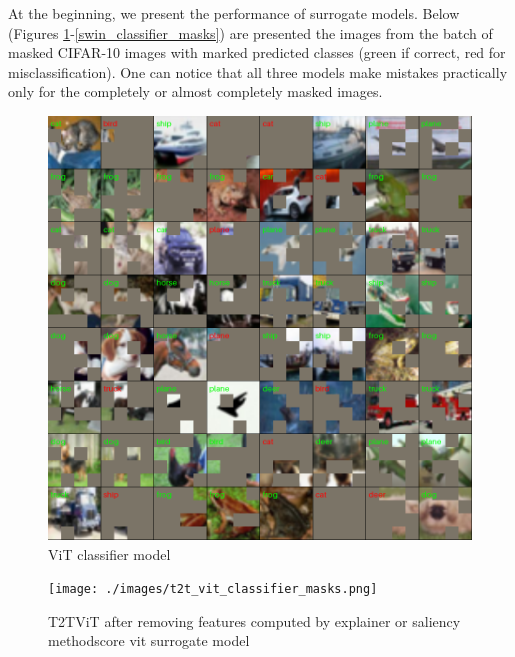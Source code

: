 \documentclass[en]{pracamgr}
\begin{document}
At the beginning, we present the performance of surrogate models. Below (Figures \ref{vit_classifier_masks}-\ref{swin_classifier_masks}) are presented the images from the batch of masked CIFAR-10 images with marked predicted classes (green if correct, red for misclassification). One can notice that all three models make mistakes practically only for the completely or almost completely masked images.

\begin{figure}[H]
\centering
\includegraphics[scale=0.5]{./images/vit_classifier_masks.png}
\caption{ViT classifier model}
\label{vit_classifier_masks}
\end{figure}


\begin{figure}[H]
\centering
\texttt{[image: ./images/t2t\_vit\_classifier\_masks.png]}
\caption{T2T\textunderscore ViT after removing features computed by explainer or saliency methodscore vit surrogate model}
\label{t2t_vit_classifier_masks}
\end{figure}
\end{document}
